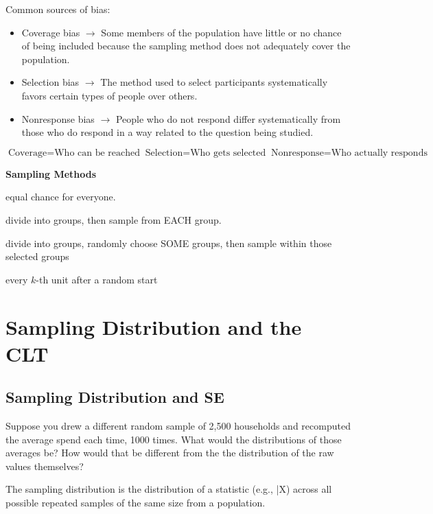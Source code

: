 \documentclass[
  letterpaper,
  DIV=11,
  numbers=noendperiod]{scrreprt}
\providecommand{\tightlist}{%
  \setlength{\itemsep}{0pt}\setlength{\parskip}{0pt}}
\begin{document}
Common sources of bias:

\begin{itemize}
\tightlist
\item
  Coverage bias \(\rightarrow\) Some members of the population have
  little or no chance of being included because the sampling method does
  not adequately cover the population.
\item
  Selection bias \(\rightarrow\) The method used to select participants
  systematically favors certain types of people over others.
\item
  Nonresponse bias \(\rightarrow\) People who do not respond differ
  systematically from those who do respond in a way related to the
  question being studied.
\end{itemize}

\[\boxed{\text{Coverage}=\text{Who can be reached}} \boxed{\text{Selection}=\text{Who gets selected}} \boxed{\text{Nonresponse}=\text{Who actually responds}}\]

\textbf{Sampling Methods}

\begin{description}
\tightlist
\item[Simple Random Sampling]
equal chance for everyone.
\item[Stratified Sampling]
divide into groups, then sample from EACH group.
\item[Cluster]
divide into groups, randomly choose SOME groups, then sample within
those selected groups
\item[Systematic]
every \(k\)-th unit after a random start
\end{description}

\section{Sampling Distribution and the
CLT}\label{sampling-distribution-and-the-clt}

\subsection{Sampling Distribution and
SE}\label{sampling-distribution-and-se}

Suppose you drew a different random sample of 2,500 households and
recomputed the average spend each time, 1000 times. What would the
distributions of those averages be? How would that be different from the
the distribution of the raw values themselves?

The sampling distribution is the distribution of a statistic (e.g.,
\bar X) across all possible repeated samples of the same size from a
population.
\end{document}
